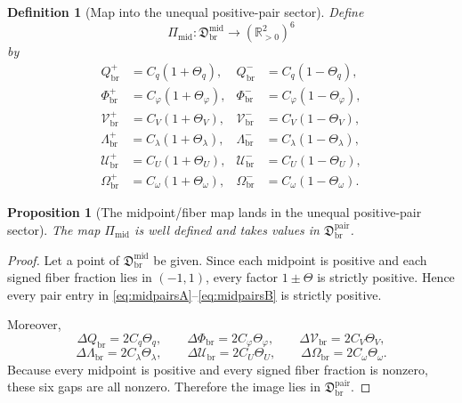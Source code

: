 \documentclass[11pt]{article}
\newcommand{\PairSector}{\mathfrak D_{\mathrm{br}}^{\mathrm{pair}}}
\newcommand{\PairReadPlus}{Q_{\mathrm{br}}^{+}}
\newcommand{\PairReadMinus}{Q_{\mathrm{br}}^{-}}
\newcommand{\PairCovPlus}{\Phi_{\mathrm{br}}^{+}}
\newcommand{\PairCovMinus}{\Phi_{\mathrm{br}}^{-}}
\newcommand{\PairRelaxPlus}{\mathcal V_{\mathrm{br}}^{+}}
\newcommand{\PairRelaxMinus}{\mathcal V_{\mathrm{br}}^{-}}
\newcommand{\PairWellPlus}{\Lambda_{\mathrm{br}}^{+}}
\newcommand{\PairWellMinus}{\Lambda_{\mathrm{br}}^{-}}
\newcommand{\PairEqPlus}{\mathcal U_{\mathrm{br}}^{+}}
\newcommand{\PairEqMinus}{\mathcal U_{\mathrm{br}}^{-}}
\newcommand{\PairScalePlus}{\Omega_{\mathrm{br}}^{+}}
\newcommand{\PairScaleMinus}{\Omega_{\mathrm{br}}^{-}}
\newcommand{\GapRead}{\Delta Q_{\mathrm{br}}}
\newcommand{\GapCov}{\Delta \Phi_{\mathrm{br}}}
\newcommand{\GapRelax}{\Delta \mathcal V_{\mathrm{br}}}
\newcommand{\GapWell}{\Delta \Lambda_{\mathrm{br}}}
\newcommand{\GapEq}{\Delta \mathcal U_{\mathrm{br}}}
\newcommand{\GapScale}{\Delta \Omega_{\mathrm{br}}}
\newcommand{\MidFiberSector}{\mathfrak D_{\mathrm{br}}^{\mathrm{mid}}}
\newcommand{\MidPairMap}{\Pi_{\mathrm{mid}}}
\newcommand{\MidRead}{C_{q}}
\newcommand{\MidCov}{C_{\varphi}}
\newcommand{\MidRelax}{C_{V}}
\newcommand{\MidWell}{C_{\lambda}}
\newcommand{\MidEq}{C_{U}}
\newcommand{\MidScale}{C_{\omega}}
\newcommand{\FiberRead}{\Theta_{q}}
\newcommand{\FiberCov}{\Theta_{\varphi}}
\newcommand{\FiberRelax}{\Theta_{V}}
\newcommand{\FiberWell}{\Theta_{\lambda}}
\newcommand{\FiberEq}{\Theta_{U}}
\newcommand{\FiberScale}{\Theta_{\omega}}
\newtheorem{definition}{Definition}
\newtheorem{proposition}{Proposition}
\begin{document}
\begin{definition}[Map into the unequal positive-pair sector]
\label{def:midpairmap}
Define
\begin{equation}
\MidPairMap:\MidFiberSector\longrightarrow(\mathbb R_{>0}^{2})^{6}
\label{eq:midpairmap}
\end{equation}
by
\begin{align}
\PairReadPlus&=\MidRead(1+\FiberRead),
&
\PairReadMinus&=\MidRead(1-\FiberRead),
\nonumber\\
\PairCovPlus&=\MidCov(1+\FiberCov),
&
\PairCovMinus&=\MidCov(1-\FiberCov),
\nonumber\\
\PairRelaxPlus&=\MidRelax(1+\FiberRelax),
&
\PairRelaxMinus&=\MidRelax(1-\FiberRelax),
\label{eq:midpairsA}
\end{align}
\begin{align}
\PairWellPlus&=\MidWell(1+\FiberWell),
&
\PairWellMinus&=\MidWell(1-\FiberWell),
\nonumber\\
\PairEqPlus&=\MidEq(1+\FiberEq),
&
\PairEqMinus&=\MidEq(1-\FiberEq),
\nonumber\\
\PairScalePlus&=\MidScale(1+\FiberScale),
&
\PairScaleMinus&=\MidScale(1-\FiberScale).
\label{eq:midpairsB}
\end{align}
\end{definition}

\begin{proposition}[The midpoint/fiber map lands in the unequal positive-pair sector]
\label{prop:lands}
The map \(\MidPairMap\) is well defined and takes values in \(\PairSector\).
\end{proposition}

\begin{proof}
Let a point of \(\MidFiberSector\) be given. Since each midpoint is positive and each signed fiber fraction lies in \((-1,1)\), every factor \(1\pm\Theta\) is strictly positive. Hence every pair entry in \eqref{eq:midpairsA}--\eqref{eq:midpairsB} is strictly positive.

Moreover,
\begin{equation}
\GapRead=2\MidRead\FiberRead,
\qquad
\GapCov=2\MidCov\FiberCov,
\qquad
\GapRelax=2\MidRelax\FiberRelax,
\label{eq:midgapsA}
\end{equation}
\begin{equation}
\GapWell=2\MidWell\FiberWell,
\qquad
\GapEq=2\MidEq\FiberEq,
\qquad
\GapScale=2\MidScale\FiberScale.
\label{eq:midgapsB}
\end{equation}
Because every midpoint is positive and every signed fiber fraction is nonzero, these six gaps are all nonzero. Therefore the image lies in \(\PairSector\).
\end{proof}
\end{document}
